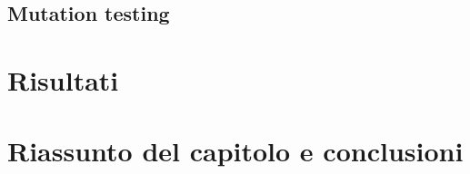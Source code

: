 \subsection{Mutation testing}

%
%

\section{Risultati}

%
%

\section{Riassunto del capitolo e conclusioni}

